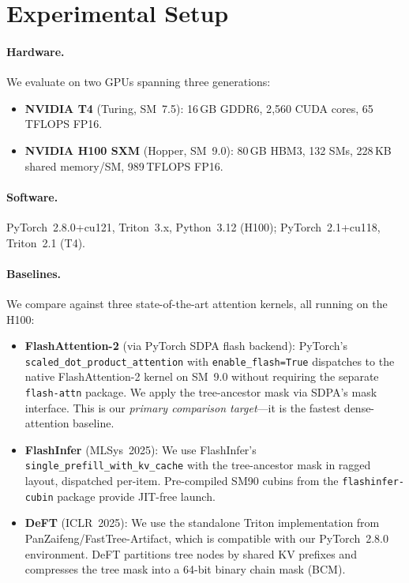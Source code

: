 \documentclass{article}
\begin{document}
\section{Experimental Setup}\label{sec:setup}

\paragraph{Hardware.}
We evaluate on two GPUs spanning three generations:
\begin{itemize}[leftmargin=*,itemsep=2pt]
  \item \textbf{NVIDIA T4} (Turing, SM~7.5): 16\,GB GDDR6,
    2{,}560 CUDA cores, 65\,TFLOPS FP16.
  \item \textbf{NVIDIA H100 SXM} (Hopper, SM~9.0): 80\,GB HBM3,
    132 SMs, 228\,KB shared memory/SM, 989\,TFLOPS FP16.
\end{itemize}

\paragraph{Software.}
PyTorch~2.8.0+cu121, Triton~3.x, Python~3.12 (H100);
PyTorch~2.1+cu118, Triton~2.1 (T4).

\paragraph{Baselines.}
We compare against three state-of-the-art attention kernels, all
running on the H100:
\begin{itemize}[leftmargin=*,itemsep=2pt]
  \item \textbf{FlashAttention-2} \cite{dao2023flashattention2}
    (via PyTorch SDPA flash backend):
    PyTorch's \texttt{scaled\_dot\_product\_attention} with
    \texttt{enable\_flash=True} dispatches to the native
    FlashAttention-2 kernel on SM~9.0 without requiring the
    separate \texttt{flash-attn} package.
    We apply the tree-ancestor mask via SDPA's mask interface.
    This is our \emph{primary comparison target}---it is the
    fastest dense-attention baseline.
  \item \textbf{FlashInfer} \cite{ye2025flashinfer}
    (MLSys~2025):
    We use FlashInfer's \texttt{single\_prefill\_with\_kv\_cache}
    with the tree-ancestor mask in ragged layout, dispatched
    per-item.  Pre-compiled SM90 cubins from the
    \texttt{flashinfer-cubin} package provide JIT-free launch.
  \item \textbf{DeFT} \cite{yao2024deft} (ICLR~2025):
    We use the standalone Triton implementation from
    PanZaifeng/FastTree-Artifact, which is compatible with our
    PyTorch~2.8.0 environment.
    DeFT partitions tree nodes by shared KV prefixes and compresses
    the tree mask into a 64-bit binary chain mask (BCM).
\end{itemize}
\end{document}
